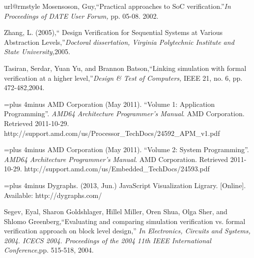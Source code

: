 \begin{thebibliography}{10}
\providecommand{\url}[1]{#1}
\csname url@rmstyle\endcsname
\providecommand{\newblock}{\relax}
\providecommand{\bibinfo}[2]{#2}
\providecommand\BIBentrySTDinterwordspacing{\spaceskip=0pt\relax}
\providecommand\BIBentryALTinterwordstretchfactor{4}
\providecommand\BIBentryALTinterwordspacing{\spaceskip=\fontdimen2\font plus
\BIBentryALTinterwordstretchfactor\fontdimen3\font minus
  \fontdimen4\font\relax}
\providecommand\BIBforeignlanguage[2]{{%
\expandafter\ifx\csname l@#1\endcsname\relax
\typeout{** WARNING: IEEEtran.bst: No hyphenation pattern has been}%
\typeout{** loaded for the language `#1'. Using the pattern for}%
\typeout{** the default language instead.}%
\else
\language=\csname l@#1\endcsname
\fi
#2}}
Mosensoson, Guy,``Practical approaches to SoC verification.''\emph{In Proceedings of DATE User Forum,} pp. 05-08. 2002.

Zhang, L. (2005),`` Design Verification for Sequential Systems at Various Abstraction Levels,''\emph{Doctoral dissertation, Virginia Polytechnic Institute and State University,}2005.

Tasiran, Serdar, Yuan Yu, and Brannon Batson,``Linking simulation with formal verification at a higher level,''\emph{Design & Test of Computers,} IEEE 21, no. 6, pp. 472-482,2004.

\BIBentryALTinterwordspacing
AMD Corporation (May 2011). ``Volume 1: Application Programming''. \emph{AMD64 Architecture Programmer's Manual}. AMD Corporation. Retrieved 2011-10-29.
\url{http://support.amd.com/us/Processor_TechDocs/24592_APM_v1.pdf}
\BIBentrySTDinterwordspacing
 
\BIBentryALTinterwordspacing
AMD Corporation (May 2011). ``Volume 2: System Programming''. \emph{AMD64 Architecture Programmer's Manual}. AMD Corporation. Retrieved 2011-10-29.
\url{http://support.amd.com/us/Embedded_TechDocs/24593.pdf}
\BIBentrySTDinterwordspacing
 
\BIBentryALTinterwordspacing
Dygraphs. (2013, Jun.) {JavaScript Visualization Ligrary}. [Online]. Available:
  \url{http://dygraphs.com/}
\BIBentrySTDinterwordspacing


Segev, Eyal, Sharon Goldshlager, Hillel Miller, Oren Shua, Olga Sher, and Shlomo Greenberg,``Evaluating and comparing simulation verification vs. formal verification approach on block level design,'' \emph{In Electronics, Circuits and Systems, 2004. ICECS 2004. Proceedings of the 2004 11th IEEE International Conference},pp. 515-518, 2004.



\end{thebibliography}
